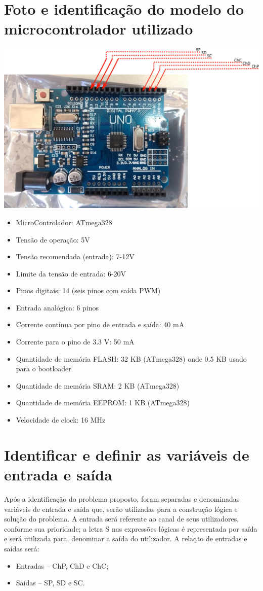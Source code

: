 \documentclass{article}
\begin{document}
\section{Foto e identificação do modelo do microcontrolador utilizado}
\includegraphics[width=\textwidth]{arduino}

\begin{itemize}
	\item MicroControlador: ATmega328
	\item Tensão de operação: 5V
	\item Tensão recomendada (entrada): 7-12V
	\item Limite da tensão de entrada: 6-20V
	\item Pinos digitais: 14 (seis pinos com saída PWM)
	\item Entrada analógica: 6 pinos
	\item Corrente contínua por pino de entrada e saída: 40 mA
	\item Corrente para o pino de 3.3 V: 50 mA
	\item Quantidade de memória FLASH: 32 KB (ATmega328) onde 0.5 KB usado para o bootloader
	\item Quantidade de memória SRAM: 2 KB (ATmega328)
	\item Quantidade de memória EEPROM: 1 KB (ATmega328)
	\item Velocidade de clock: 16 MHz
\end{itemize}

\section{Identificar e definir as  variáveis de entrada e saída}
Após a identificação do problema proposto, foram separadas e denominadas variáveis de entrada e saída que, serão utilizadas para a construção lógica e solução do problema. A entrada será referente ao canal de seus utilizadores, conforme sua prioridade; a letra S nas expressões lógicas é representada por saída e será utilizada para, denominar a saída do utilizador. A relação de entradas e saídas será:
\begin{itemize}
	\item Entradas – ChP, ChD e ChC;
	\item Saídas – SP, SD e SC.
\end{itemize}
\end{document}
